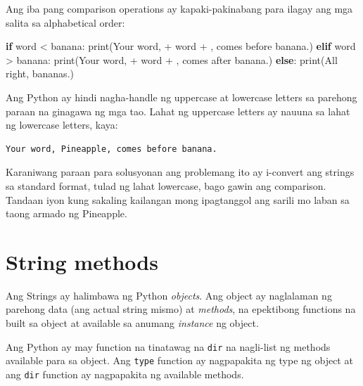 \documentclass[10pt,]{book}
\newenvironment{Shaded}{}{}
\newcommand{\BuiltInTok}[1]{\textcolor[rgb]{0.00,0.50,0.00}{#1}}
\newcommand{\ControlFlowTok}[1]{\textcolor[rgb]{0.00,0.44,0.13}{\textbf{#1}}}
\newcommand{\NormalTok}[1]{#1}
\newcommand{\OperatorTok}[1]{\textcolor[rgb]{0.40,0.40,0.40}{#1}}
\newcommand{\StringTok}[1]{\textcolor[rgb]{0.25,0.44,0.63}{#1}}
\begin{document}
Ang iba pang comparison operations ay kapaki-pakinabang para ilagay ang
mga salita sa alphabetical order:

\begin{Shaded}
\begin{Highlighting}[]
\ControlFlowTok{if}\NormalTok{ word }\OperatorTok{\textless{}} \StringTok{\textquotesingle{}banana\textquotesingle{}}\NormalTok{:}
    \BuiltInTok{print}\NormalTok{(}\StringTok{\textquotesingle{}Your word,\textquotesingle{}} \OperatorTok{+}\NormalTok{ word }\OperatorTok{+} \StringTok{\textquotesingle{}, comes before banana.\textquotesingle{}}\NormalTok{)}
\ControlFlowTok{elif}\NormalTok{ word }\OperatorTok{\textgreater{}} \StringTok{\textquotesingle{}banana\textquotesingle{}}\NormalTok{:}
    \BuiltInTok{print}\NormalTok{(}\StringTok{\textquotesingle{}Your word,\textquotesingle{}} \OperatorTok{+}\NormalTok{ word }\OperatorTok{+} \StringTok{\textquotesingle{}, comes after banana.\textquotesingle{}}\NormalTok{)}
\ControlFlowTok{else}\NormalTok{:}
    \BuiltInTok{print}\NormalTok{(}\StringTok{\textquotesingle{}All right, bananas.\textquotesingle{}}\NormalTok{)}
\end{Highlighting}
\end{Shaded}

Ang Python ay hindi nagha-handle ng uppercase at lowercase letters sa
parehong paraan na ginagawa ng mga tao. Lahat ng uppercase letters ay
nauuna sa lahat ng lowercase letters, kaya:

{\small
\begin{verbatim}
Your word, Pineapple, comes before banana.
\end{verbatim}
}

Karaniwang paraan para solusyonan ang problemang ito ay i-convert ang
strings sa standard format, tulad ng lahat lowercase, bago gawin ang
comparison. Tandaan iyon kung sakaling kailangan mong ipagtanggol ang
sarili mo laban sa taong armado ng Pineapple.

\section{String methods}\label{string-methods}

Ang Strings ay halimbawa ng Python \emph{objects}. Ang object ay
naglalaman ng parehong data (ang actual string mismo) at \emph{methods},
na epektibong functions na built sa object at available sa anumang
\emph{instance} ng object.

Ang Python ay may function na tinatawag na \texttt{dir} na nagli-list ng
methods available para sa object. Ang \texttt{type} function ay
nagpapakita ng type ng object at ang \texttt{dir} function ay
nagpapakita ng available methods.
\end{document}
